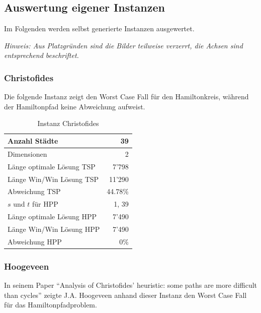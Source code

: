 \documentclass[11pt,a4paper]{article}
\begin{document}
\subsection{Auswertung eigener Instanzen}
Im Folgenden werden selbst generierte Instanzen ausgewertet. 

\begin{flushleft}
\emph{Hinweis: Aus Platzgründen sind die Bilder teilweise verzerrt, die Achsen sind entsprechend beschriftet.}
\end{flushleft}

\subsubsection{Christofides}
Die folgende Instanz zeigt den Worst Case Fall für den Hamiltonkreis, während der Hamiltonpfad keine Abweichung aufweist.

        \begin{table}[H]
                \centering
                \begin{tabular}{| l | r |}
                    \hline
                        Anzahl Städte               & 39            \\ \hline
                        Dimensionen                 & 2             \\ \hline
                        Länge optimale Lösung TSP   & 7'798         \\ \hline
                        Länge Win/Win Lösung  TSP   & 11'290        \\ \hline
                        Abweichung TSP              & 44.78\%       \\ \hline
                        $s$ und $t$ für HPP         & 1, 39         \\ \hline
                        Länge optimale Lösung HPP   & 7'490         \\ \hline
                        Länge Win/Win Lösung  HPP   & 7'490         \\ \hline
                        Abweichung HPP              & 0\%           \\ \hline
                \end{tabular}
                \caption{Instanz Christofides}
                \label{tab:instanz_christofides}
        \end{table}

\subsubsection{Hoogeveen}
In seinem Paper "`Analysis of Christofides' heuristic: some paths are more difficult than cycles"'\cite{hoogeveen91} zeigte J.A. Hoogeveen anhand dieser Instanz den Worst Case Fall für das Hamiltonpfadproblem.
\end{document}
